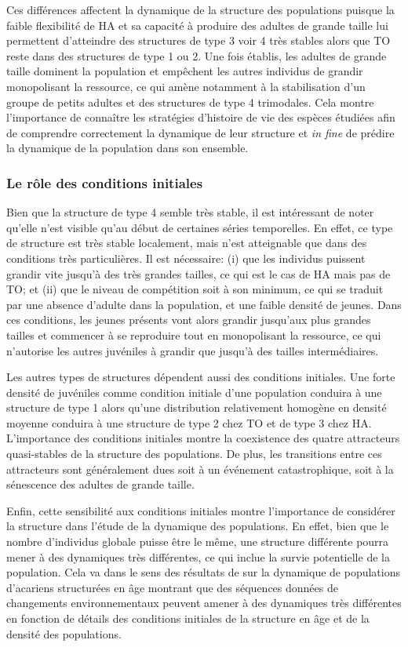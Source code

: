 Ces différences affectent la dynamique de la structure des populations puisque
la faible flexibilité de HA et sa capacité à produire des adultes de grande
taille lui permettent d'atteindre des structures de type 3 voir 4 très
stables alors que TO reste dans des structures de type 1 ou 2. Une
fois établis, les adultes de grande taille dominent la population et empêchent
les autres individus de grandir monopolisant la ressource, ce qui amène
notamment à la stabilisation d'un groupe de petits adultes et des structures de
type 4 trimodales. Cela montre l'importance de connaître les stratégies
d'histoire de vie des espèces étudiées afin de comprendre correctement la
dynamique de leur structure et \textit{in fine} de prédire la dynamique de la
population dans son ensemble.

\subsubsection{Le rôle des conditions initiales}

Bien que la structure de type 4 semble très stable, il est intéressant de noter
qu'elle n'est visible qu'au début de certaines séries temporelles. En effet, ce
type de structure est très stable localement, mais n'est atteignable que dans
des conditions très particulières. Il est nécessaire: (i) que les individus
puissent grandir vite jusqu'à des très grandes tailles, ce qui est le cas
de HA mais pas de TO; et (ii) que le niveau de compétition soit à son minimum,
ce qui se traduit par une absence d'adulte dans la population, et une faible
densité de jeunes. Dans ces conditions, les jeunes présents vont alors grandir
jusqu'aux plus grandes tailles et commencer à se reproduire tout en monopolisant
la ressource, ce qui n'autorise les autres juvéniles à grandir que jusqu'à des
tailles intermédiaires. 

Les autres types de structures dépendent aussi des conditions initiales. Une
forte densité de juvéniles comme condition initiale d'une population conduira à
une structure de type 1 alors qu'une distribution relativement homogène en
densité moyenne conduira à une structure de type 2 chez TO et de type 3 chez HA.
L'importance des conditions initiales montre la coexistence des quatre
attracteurs quasi-stables de la structure des populations. De plus, les
transitions entre ces attracteurs sont généralement dues soit à un événement
catastrophique, soit à la sénescence des adultes de grande taille. 

Enfin, cette sensibilité aux conditions initiales montre l'importance de
considérer la structure dans l'étude de la dynamique des populations. En effet,
bien que le nombre d'individus globale puisse être le même, une structure
différente pourra mener à des dynamiques très différentes, ce
qui inclue la survie potentielle de la population. Cela va dans le sens des
résultats de \textcites{benton2005a} sur la dynamique de populations
d'acariens structurées en âge montrant que des séquences données de changements
environnementaux peuvent amener à des dynamiques très différentes en fonction de
détails des conditions initiales de la structure en âge et de la densité des
populations.

